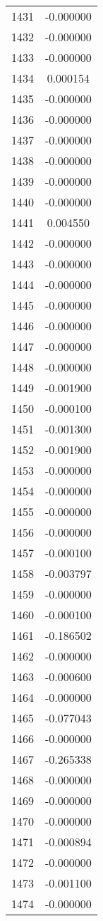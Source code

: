 \documentclass[12pt]{article}
\begin{document}
\begin{longtable}{@{}cc@{}}
1431 & -0.000000 \\
1432 & -0.000000 \\
1433 & -0.000000 \\
1434 & 0.000154 \\
1435 & -0.000000 \\
1436 & -0.000000 \\
1437 & -0.000000 \\
1438 & -0.000000 \\
1439 & -0.000000 \\
1440 & -0.000000 \\
1441 & 0.004550 \\
1442 & -0.000000 \\
1443 & -0.000000 \\
1444 & -0.000000 \\
1445 & -0.000000 \\
1446 & -0.000000 \\
1447 & -0.000000 \\
1448 & -0.000000 \\
1449 & -0.001900 \\
1450 & -0.000100 \\
1451 & -0.001300 \\
1452 & -0.001900 \\
1453 & -0.000000 \\
1454 & -0.000000 \\
1455 & -0.000000 \\
1456 & -0.000000 \\
1457 & -0.000100 \\
1458 & -0.003797 \\
1459 & -0.000000 \\
1460 & -0.000100 \\
1461 & -0.186502 \\
1462 & -0.000000 \\
1463 & -0.000600 \\
1464 & -0.000000 \\
1465 & -0.077043 \\
1466 & -0.000000 \\
1467 & -0.265338 \\
1468 & -0.000000 \\
1469 & -0.000000 \\
1470 & -0.000000 \\
1471 & -0.000894 \\
1472 & -0.000000 \\
1473 & -0.001100 \\
1474 & -0.000000 \\

\end{longtable}
\end{document}
